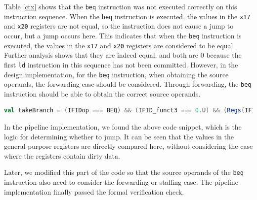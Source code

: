 \documentclass[conference]{IEEEtran}
\theoremstyle{definition}
\begin{document}
Table \ref{ctx} shows that the \verb|beq| instruction was not executed correctly on this instruction sequence.
When the \verb|beq| instruction is executed, the values in the \verb|x17| and \verb|x20| registers are not equal, so the instruction does not cause a jump to occur, but a jump occurs here.
This indicates that when the \verb|beq| instruction is executed, the values in the \verb|x17| and \verb|x20| registers are considered to be equal.
Further analysis shows that they are indeed equal, and both are 0 because the first \verb|ld| instruction in this sequence has not been committed.
However, in the design implementation, for the \verb|beq| instruction, when obtaining the source operands, the forwarding case should be considered.
Through forwarding, the \verb|beq| instruction should be able to obtain the correct source operands.

\begin{lstlisting}[language=scala, caption={A Code Snippet in the Pipeline Design}, label=designcode]
val takeBranch = (IFIDop === BEQ) && (IFID_funct3 === 0.U) && (Regs(IFIDrs1) === Regs(IFIDrs2))
\end{lstlisting}

In the pipeline implementation, we found the above code snippet, which is the logic for determining whether to jump.
It can be seen that the values in the general-purpose registers are directly compared here, without considering the case where the registers contain dirty data.

Later, we modified this part of the code so that the source operands of the \verb|beq| instruction also need to consider the forwarding or stalling case. 
The pipeline implementation finally passed the formal verification check.
\end{document}
